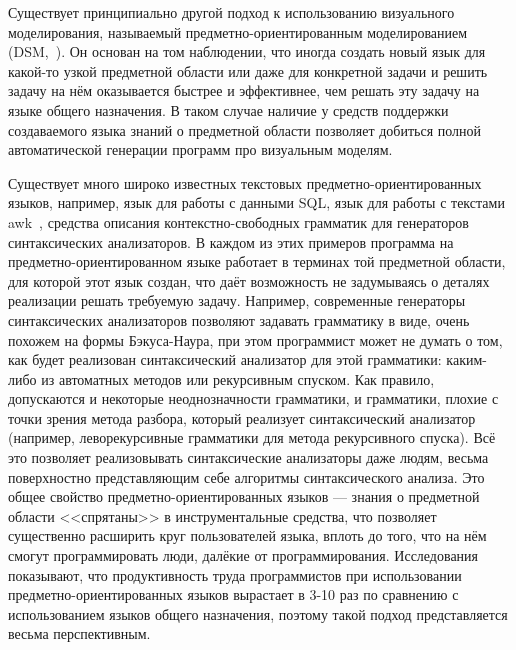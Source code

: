 Существует принципиально другой подход к использованию визуального 
моделирования, называемый предметно-ориентированным моделированием 
(\ac{DSM},~\cite{kelly2008domain}). Он основан на том 
наблюдении, что иногда создать новый язык для какой-то узкой предметной области 
или даже для конкретной задачи и решить задачу на нём оказывается быстрее и 
эффективнее, чем решать эту задачу на языке общего назначения. В таком случае 
наличие у средств поддержки создаваемого языка знаний о предметной области 
позволяет добиться полной автоматической генерации программ про визуальным 
моделям. 

Существует много широко известных текстовых предметно-ориентированных языков, 
например, язык для работы с данными \ac{SQL}, 
язык для работы с текстами awk~\cite{awk}, средства описания контекстно-свободных грамматик для генераторов синтаксических 
анализаторов. В каждом из этих примеров программа на предметно-ориентированном 
языке работает в терминах той предметной области, для которой этот язык создан,
что даёт возможность не задумываясь о деталях реализации решать требуемую 
задачу. Например, современные генераторы синтаксических анализаторов позволяют 
задавать грамматику в виде, очень похожем на формы Бэкуса-Наура, при этом 
программист может не думать о том, как будет реализован синтаксический 
анализатор для этой грамматики: каким-либо из автоматных методов или рекурсивным 
спуском. Как правило, допускаются и некоторые неоднозначности грамматики, и 
грамматики, плохие с точки зрения метода разбора, который реализует 
синтаксический анализатор (например, леворекурсивные грамматики для метода 
рекурсивного спуска). Всё это позволяет реализовывать синтаксические анализаторы 
даже людям, весьма поверхностно представляющим себе алгоритмы синтаксического 
анализа. Это общее свойство предметно-ориентированных языков --- знания о 
предметной области <<спрятаны>> в инструментальные средства, что позволяет 
существенно расширить круг пользователей языка, вплоть до того, что на нём 
смогут программировать люди, далёкие от программирования. Исследования 
\cite{kieburtz1996software, kelly2000visual, gray2003examination} показывают, 
что продуктивность труда программистов при использовании 
предметно-ориентированных языков вырастает в 3-10 раз по сравнению с 
использованием языков общего назначения, поэтому такой подход представляется 
весьма перспективным.

